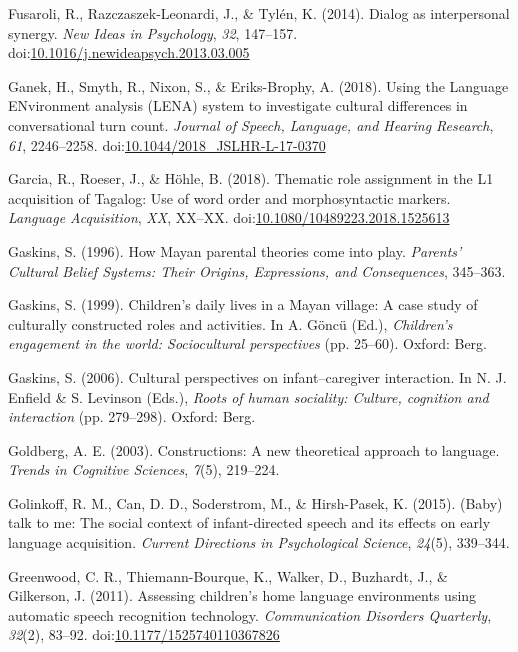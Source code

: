 \documentclass[floatsintext,man]{apa6}
\theoremstyle{definition}
\theoremstyle{definition}
\theoremstyle{definition}
\theoremstyle{remark}
\begin{document}
\hypertarget{ref-fusaroli2014synergy}{}
Fusaroli, R., Razczaszek-Leonardi, J., \& Tylén, K. (2014). Dialog as
interpersonal synergy. \emph{New Ideas in Psychology}, \emph{32},
147--157.
doi:\href{https://doi.org/10.1016/j.newideapsych.2013.03.005}{10.1016/j.newideapsych.2013.03.005}

\hypertarget{ref-ganek2018using}{}
Ganek, H., Smyth, R., Nixon, S., \& Eriks-Brophy, A. (2018). Using the
Language ENvironment analysis (LENA) system to investigate cultural
differences in conversational turn count. \emph{Journal of Speech,
Language, and Hearing Research}, \emph{61}, 2246--2258.
doi:\href{https://doi.org/10.1044/2018_JSLHR-L-17-0370}{10.1044/2018\_JSLHR-L-17-0370}

\hypertarget{ref-garcia2018thematic}{}
Garcia, R., Roeser, J., \& Höhle, B. (2018). Thematic role assignment in
the L1 acquisition of Tagalog: Use of word order and morphosyntactic
markers. \emph{Language Acquisition}, \emph{XX}, XX--XX.
doi:\href{https://doi.org/10.1080/10489223.2018.1525613}{10.1080/10489223.2018.1525613}

\hypertarget{ref-gaskins1996how}{}
Gaskins, S. (1996). How Mayan parental theories come into play.
\emph{Parents' Cultural Belief Systems: Their Origins, Expressions, and
Consequences}, 345--363.

\hypertarget{ref-gaskins1999childrens}{}
Gaskins, S. (1999). Children's daily lives in a Mayan village: A case
study of culturally constructed roles and activities. In A. Göncü (Ed.),
\emph{Children's engagement in the world: Sociocultural perspectives}
(pp. 25--60). Oxford: Berg.

\hypertarget{ref-gaskins2006cultural}{}
Gaskins, S. (2006). Cultural perspectives on infant--caregiver
interaction. In N. J. Enfield \& S. Levinson (Eds.), \emph{Roots of
human sociality: Culture, cognition and interaction} (pp. 279--298).
Oxford: Berg.

\hypertarget{ref-goldberg2003constructions}{}
Goldberg, A. E. (2003). Constructions: A new theoretical approach to
language. \emph{Trends in Cognitive Sciences}, \emph{7}(5), 219--224.

\hypertarget{ref-golinkoff2015baby}{}
Golinkoff, R. M., Can, D. D., Soderstrom, M., \& Hirsh-Pasek, K. (2015).
(Baby) talk to me: The social context of infant-directed speech and its
effects on early language acquisition. \emph{Current Directions in
Psychological Science}, \emph{24}(5), 339--344.

\hypertarget{ref-greenwood2011assessing}{}
Greenwood, C. R., Thiemann-Bourque, K., Walker, D., Buzhardt, J., \&
Gilkerson, J. (2011). Assessing children's home language environments
using automatic speech recognition technology. \emph{Communication
Disorders Quarterly}, \emph{32}(2), 83--92.
doi:\href{https://doi.org/10.1177/1525740110367826}{10.1177/1525740110367826}
\end{document}
